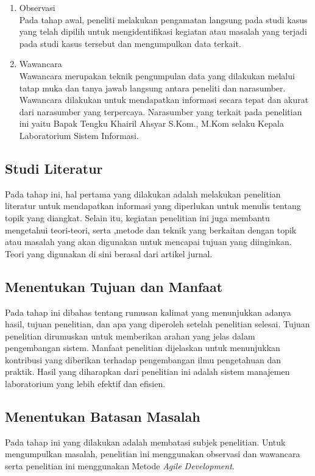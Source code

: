 \begin{enumerate}
	\item Observasi \\
	      Pada tahap awal, peneliti melakukan pengamatan langsung pada studi kasus yang telah dipilih untuk mengidentifikasi kegiatan atau masalah yang terjadi pada studi kasus tersebut dan mengumpulkan data terkait.

	\item Wawancara \\
	      Wawancara merupakan teknik pengumpulan data yang dilakukan melalui tatap muka dan tanya jawab langsung antara peneliti dan narasumber. Wawancara dilakukan untuk mendapatkan informasi secara tepat dan akurat dari narasumber yang terpercaya. Narasumber yang terkait pada penelitian ini yaitu Bapak Tengku Khairil Ahsyar S.Kom., M.Kom selaku Kepala Laboratorium Sistem Informasi.
\end{enumerate}

\subsection{Studi Literatur}
Pada tahap ini, hal pertama yang dilakukan adalah melakukan penelitian literatur untuk mendapatkan informasi yang diperlukan untuk menulis tentang topik yang diangkat. Selain itu, kegiatan penelitian ini juga membantu mengetahui teori-teori, serta ,metode dan teknik yang berkaitan dengan topik atau masalah yang akan digunakan untuk mencapai tujuan yang diinginkan. Teori yang digunakan di sini berasal dari artikel jurnal.

\subsection{Menentukan Tujuan dan Manfaat}
Pada tahap ini dibahas tentang rumusan kalimat yang menunjukkan adanya hasil, tujuan penelitian, dan apa yang diperoleh setelah penelitian selesai. Tujuan penelitian dirumuskan untuk memberikan arahan yang jelas dalam pengembangan sistem. Manfaat penelitian dijelaskan untuk menunjukkan kontribusi yang diberikan terhadap pengembangan ilmu pengetahuan dan praktik. Hasil yang diharapkan dari penelitian ini adalah sistem manajemen laboratorium yang lebih efektif dan efisien.

\subsection{Menentukan Batasan Masalah}
Pada tahap ini yang dilakukan adalah membatasi subjek penelitian. Untuk mengumpulkan masalah, penelitian ini menggunakan observasi dan wawancara serta penelitian ini menggunakan Metode \textit{Agile Development}.

